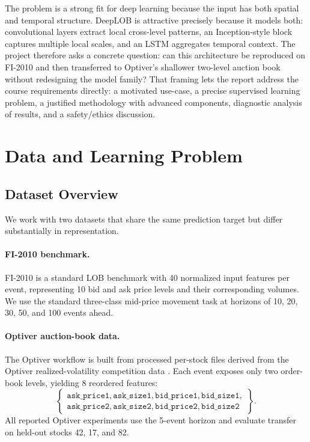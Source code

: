 \documentclass[11pt]{article}
\begin{document}
The problem is a strong fit for deep learning because the input has both spatial and temporal structure. DeepLOB \cite{zhang2019deeplob} is attractive precisely because it models both: convolutional layers extract local cross-level patterns, an Inception-style block captures multiple local scales, and an LSTM aggregates temporal context. The project therefore asks a concrete question: can this architecture be reproduced on FI-2010 and then transferred to Optiver's shallower two-level auction book without redesigning the model family? That framing lets the report address the course requirements directly: a motivated use-case, a precise supervised learning problem, a justified methodology with advanced components, diagnostic analysis of results, and a safety/ethics discussion.

\section{Data and Learning Problem}
\subsection{Dataset Overview}
We work with two datasets that share the same prediction target but differ substantially in representation.

\paragraph{FI-2010 benchmark.}
FI-2010 \cite{ntakaris2018benchmark} is a standard LOB benchmark with 40 normalized input features per event, representing 10 bid and ask price levels and their corresponding volumes. We use the standard three-class mid-price movement task at horizons of 10, 20, 30, 50, and 100 events ahead.

\paragraph{Optiver auction-book data.}
The Optiver workflow is built from processed per-stock files derived from the Optiver realized-volatility competition data \cite{optiverkaggle}. Each event exposes only two order-book levels, yielding 8 reordered features:
\[
\left\{
\begin{array}{l}
\texttt{ask\_price1}, \texttt{ask\_size1}, \texttt{bid\_price1}, \texttt{bid\_size1}, \\
\texttt{ask\_price2}, \texttt{ask\_size2}, \texttt{bid\_price2}, \texttt{bid\_size2}
\end{array}
\right\}.
\]
All reported Optiver experiments use the 5-event horizon and evaluate transfer on held-out stocks 42, 17, and 82.
\end{document}
